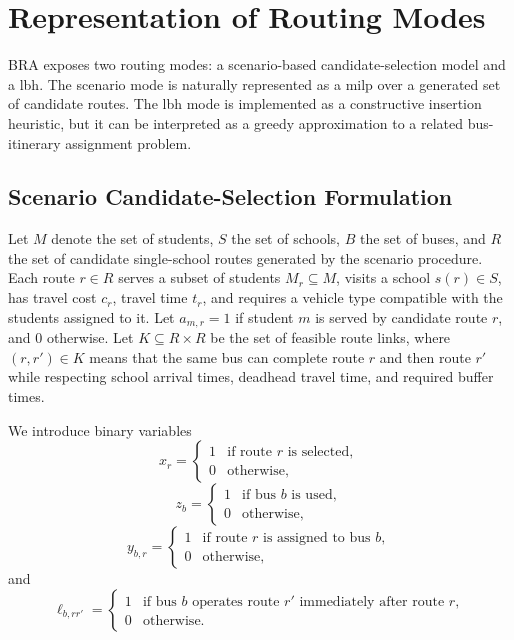 \chapter{ Representation of  Routing Modes}
\label{ap:math}

BRA exposes two routing modes: a scenario-based candidate-selection model and a \gls{lbh}. The scenario mode is naturally represented as a \gls{milp} over a generated set of candidate routes. The \gls{lbh} mode is implemented as a constructive insertion heuristic, but it can be interpreted as a greedy approximation to a related bus-itinerary assignment problem.

\section{Scenario Candidate-Selection Formulation}

Let $M$ denote the set of students, $S$ the set of schools, $B$ the set of buses, and $R$ the set of candidate single-school routes generated by the scenario procedure. Each route $r\in R$ serves a subset of students $M_r \subseteq M$, visits a school $s\left(r\right)\in S$, has travel cost $c_r$, travel time $t_r$, and requires a vehicle type compatible with the students assigned to it. Let $a_{m,r}=1$ if student $m$ is served by candidate route $r$, and 0 otherwise. Let $K\subseteq R\times R$ be the set of feasible route links, where $\left(r,r'\right)\in K$ means that the same bus can complete route $r$ and then route $r'$ while respecting school arrival times, deadhead travel time, and required buffer times.

We introduce binary variables
\[
x_r =
\begin{cases}
1 & \text{if route } r \text{ is selected},\\
0 & \text{otherwise,}
\end{cases}
\]
\[
z_b =
\begin{cases}
1 & \text{if bus } b \text{ is used},\\
0 & \text{otherwise,}
\end{cases}
\]
\[
y_{b,r} =
\begin{cases}
1 & \text{if route } r \text{ is assigned to bus } b,\\
0 & \text{otherwise,}
\end{cases}
\]
and
\[
\ell_{b,rr'} =
\begin{cases}
1 & \text{if bus } b \text{ operates route } r' \text{ immediately after route } r,\\
0 & \text{otherwise.}
\end{cases}
\]

